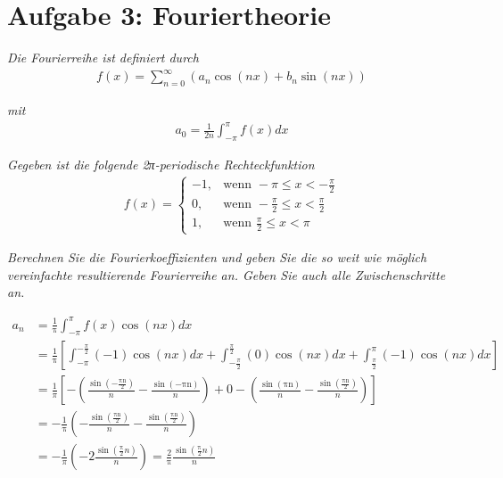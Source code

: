 \documentclass[
  ngerman,
  DIV=14
]{scrartcl}
\begin{document}
\section*{Aufgabe 3: Fouriertheorie}

\emph{Die Fourierreihe ist definiert durch}
\begin{align*}
  f(x) = \sum_{n=0}^{\infty} (a_n \cos(n x) + b_n \sin(n x))
\end{align*}

\emph{mit}
\begin{align*}
a_0 = \frac{1}{2n}\int_{-\pi}^{\pi} f(x) dx  
\end{align*}

\emph{Gegeben ist die folgende 2π-periodische Rechteckfunktion}
\begin{align*}
f(x) = \begin{cases}
  -1, & \text{wenn } -\pi \leq x < -\frac{\pi}{2}\\
  0, & \text{wenn } -\frac{\pi}{2} \leq x < \frac{\pi}{2}\\
  1, & \text{wenn } \frac{\pi}{2} \leq x < \pi
\end{cases} 
\end{align*}


\emph{Berechnen Sie die Fourierkoeffizienten und geben Sie die so weit wie möglich vereinfachte resultierende Fourierreihe an. Geben Sie auch alle Zwischenschritte an.}

\begin{align*}
a_n 
  &= \frac{1}{\mathrm\pi}
  \int_{-\pi}^\pi f(x)\cos(n x) dx\\
  &= \frac{1}{\mathrm\pi} \left[\int_{-\pi}^{-\frac{\pi}{2}} (-1) \cos(n x) dx + \int_{-\frac{\pi}{2}}^\frac{\pi}{2} (0) \cos(n x) dx + \int_\frac{\pi}{2}^\pi (-1) \cos(n x) dx\right]\\
&=\frac{1}{\pi}\left[-\left(\frac{\sin(-\frac{\mathrm{πn}}2)}n-\frac{\sin(-\mathrm{πn})}n\right)+0-\left(\frac{\sin(\mathrm{πn})}n-\frac{\sin(\frac{\mathrm{πn}}2)}n\right)\right]\\
&=-\frac1{\mathrm\pi}\left(-\frac{\sin(\frac{\mathrm{πn}}2)}n-\frac{\sin(\frac{\mathrm{πn}}2)}n\right)\\
&=-\frac{1}{\pi}\left(-2\frac{\sin(\frac{\mathrm\pi}2n)}{\displaystyle n}\right)=\frac2{\mathrm\pi}\frac{\sin(\frac{\mathrm\pi}{2} n)}{n}
\end{align*}
\end{document}
